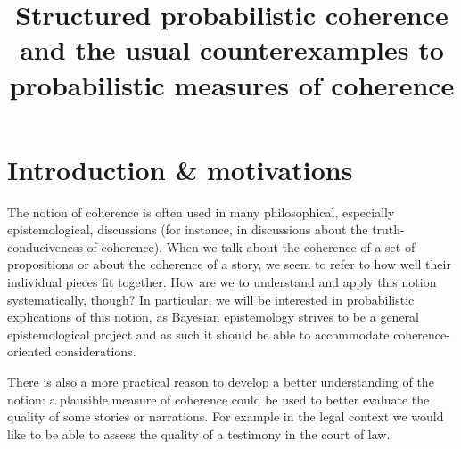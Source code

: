 \documentclass[
  10pt,
]{scrartcl}
\title{Structured probabilistic coherence \linebreak and the usual counterexamples to probabilistic measures of coherence}
\author{}
\date{\vspace{-2.5em}}
\begin{document}
\maketitle

{
\hypersetup{linkcolor=blue}
\setcounter{tocdepth}{3}
\tableofcontents
}
\setlength{\abovedisplayskip}{-10pt}
\setlength{\belowdisplayskip}{5pt}

\pagebreak

\hypertarget{introduction-motivations}{%
\section{Introduction \& motivations}\label{introduction-motivations}}

The notion of coherence is often used in many philosophical, especially epistemological, discussions (for instance, in discussions about the truth-conduciveness of coherence). When we talk about the coherence of a set of propositions or about the coherence of a story, we seem to refer to how well their individual pieces fit together. How are we to understand and apply this notion systematically, though? In particular, we will be interested in probabilistic explications of this notion, as Bayesian epistemology strives to be a general epistemological project and as such it should be able to accommodate coherence-oriented considerations.

There is also a more practical reason to develop a better understanding of the notion: a plausible measure of coherence could be used to better evaluate the quality of some stories or narrations. For example in the legal context we would like to be able to assess the quality of a testimony in the court of law.\\
\end{document}
